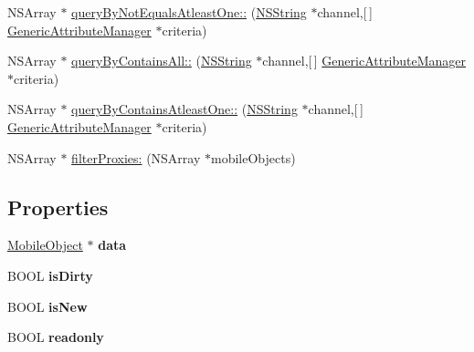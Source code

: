 \begin{DoxyCompactItemize}
\item 
\-N\-S\-Array $\ast$ \hyperlink{interface_mobile_bean_ac9e76ed3e5b926cbcdfb278c3137d7a9}{query\-By\-Not\-Equals\-Atleast\-One\-::} (\hyperlink{class_n_s_string}{\-N\-S\-String} $\ast$channel,\mbox{[}$\,$\mbox{]} \hyperlink{interface_generic_attribute_manager}{\-Generic\-Attribute\-Manager} $\ast$criteria)
\item 
\-N\-S\-Array $\ast$ \hyperlink{interface_mobile_bean_aeeb2ead229395df6dd1f7ba197352856}{query\-By\-Contains\-All\-::} (\hyperlink{class_n_s_string}{\-N\-S\-String} $\ast$channel,\mbox{[}$\,$\mbox{]} \hyperlink{interface_generic_attribute_manager}{\-Generic\-Attribute\-Manager} $\ast$criteria)
\item 
\-N\-S\-Array $\ast$ \hyperlink{interface_mobile_bean_a8eaecfd835a3424471964b88e12b9b95}{query\-By\-Contains\-Atleast\-One\-::} (\hyperlink{class_n_s_string}{\-N\-S\-String} $\ast$channel,\mbox{[}$\,$\mbox{]} \hyperlink{interface_generic_attribute_manager}{\-Generic\-Attribute\-Manager} $\ast$criteria)
\item 
\-N\-S\-Array $\ast$ \hyperlink{interface_mobile_bean_a9fb574b192ae78c2a18f24701b997a32}{filter\-Proxies\-:} (\-N\-S\-Array $\ast$mobile\-Objects)
\end{DoxyCompactItemize}
\subsection*{\-Properties}
\begin{DoxyCompactItemize}
\item 
\hypertarget{interface_mobile_bean_afbb725368f73fc95c7896c466e6ab913}{
\hyperlink{interface_mobile_object}{\-Mobile\-Object} $\ast$ {\bfseries data}}
\label{interface_mobile_bean_afbb725368f73fc95c7896c466e6ab913}

\item 
\hypertarget{interface_mobile_bean_a13520d7327987f517659625a25290036}{
\-B\-O\-O\-L {\bfseries is\-Dirty}}
\label{interface_mobile_bean_a13520d7327987f517659625a25290036}

\item 
\hypertarget{interface_mobile_bean_adfb5677488f58845e4873d8b1edfe15d}{
\-B\-O\-O\-L {\bfseries is\-New}}
\label{interface_mobile_bean_adfb5677488f58845e4873d8b1edfe15d}

\item 
\hypertarget{interface_mobile_bean_a9d7d56a7ab0d2e868ebd251fd1582861}{
\-B\-O\-O\-L {\bfseries readonly}}
\label{interface_mobile_bean_a9d7d56a7ab0d2e868ebd251fd1582861}

\end{DoxyCompactItemize}


